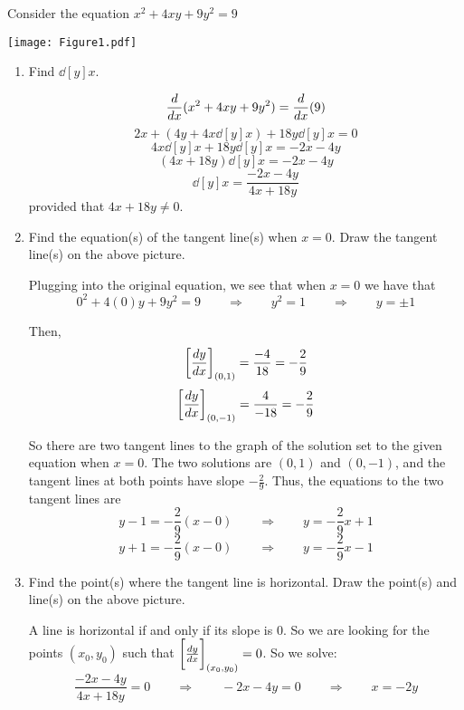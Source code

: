 \documentclass[handout,nooutcomes]{ximera}
\begin{document}
\begin{problem}
Consider the equation $x^2 + 4xy + 9y^2 = 9$

\begin{image}
\texttt{[image: Figure1.pdf]}
\end{image}

	\begin{enumerate}
	
	\item  Find $\dd[y]{x}$.
		\begin{freeResponse}
		$$ \ddx(x^2 + 4xy + 9y^2) = \ddx(9) $$
		$$ 2x + \left(4y + 4x \dd[y]{x} \right) + 18 y \dd[y]{x} = 0 $$
		$$ 4x \dd[y]{x} + 18y \dd[y]{x} = -2x - 4y $$
		$$ (4x+18y) \dd[y]{x} = -2x-4y $$
		$$ \dd[y]{x} = \frac{-2x-4y}{4x+18y} $$
		provided that $4x+18y \neq 0$.
		\end{freeResponse}
		
		
		
	\item  Find the equation(s) of the tangent line(s) when $x=0$.  Draw the tangent line(s) on the above picture.
		\begin{freeResponse}
		Plugging into the original equation, we see that when $x=0$ we have that 
		$$ 0^2 + 4(0)y + 9y^2 = 9 \qquad \Longrightarrow \qquad y^2 = 1 \qquad \Longrightarrow \qquad y = \pm 1 $$
		
		Then,
		$$\eval{\dd[y]{x}}_{(0,1)} = \frac{-4}{18} = -\frac{2}{9}$$
		$$\eval{\dd[y]{x}}_{(0,-1)} = \frac{4}{-18} = -\frac{2}{9} $$
		
		So there are two tangent lines to the graph of the solution set to the given equation when $x=0$.  The two solutions are $(0,1)$ and $(0,-1)$, and the tangent lines at both points have slope $-\frac{2}{9}$.  Thus, the equations to the two tangent lines are
		$$ y - 1 = -\frac{2}{9}(x-0)  \qquad \Longrightarrow \qquad y = -\frac{2}{9}x + 1 $$
		$$ y + 1 = -\frac{2}{9}(x-0) \qquad \Longrightarrow \qquad y = -\frac{2}{9}x - 1 $$
		\end{freeResponse}
		
		
		
	\item  Find the point(s) where the tangent line is horizontal.  Draw the point(s) and line(s) on the above picture.
		\begin{freeResponse}
		A line is horizontal if and only if its slope is 0.  So we are looking for the points $(x_0,y_0)$ such that $\eval{\dd[y]{x}}_{(x_0,y_0)} = 0$.  So we solve:
		$$ \frac{-2x-4y}{4x+18y} = 0\qquad \Longrightarrow \qquad -2x - 4y = 0 \qquad \Longrightarrow \qquad x=-2y$$
		

\end{freeResponse}
\end{enumerate}
\end{problem}
\end{document}
